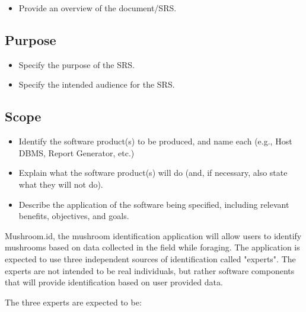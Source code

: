 \documentclass[]{article}
\begin{document}
\begin{itemize}
	\item Provide an overview of the document/SRS.
\end{itemize}


\subsection{Purpose}
\label{sub:purpose}
\begin{itemize}
	\item Specify the purpose of the SRS.
	\item Specify the intended audience for the SRS.
\end{itemize}

\subsection{Scope}
\label{sub:scope}
\begin{itemize}
	\item Identify the software product(s) to be produced, and name each (e.g., Host DBMS, Report Generator, etc.)
	\item Explain what the software product(s) will do (and, if necessary, also state what they will not do).
	\item Describe the application of the software being specified, including relevant benefits, objectives, and goals.
\end{itemize}

\noindent
Mushroom.id, the mushroom identification application will allow users to identify mushrooms based on data collected in the field while foraging. The application is expected to use three
independent sources of identification called "experts". The experts are not intended to be real individuals, but rather software components that will provide identification based on user provided data. 

\vspace{0.5cm}
\noindent
The three experts are expected to be:
\end{document}
